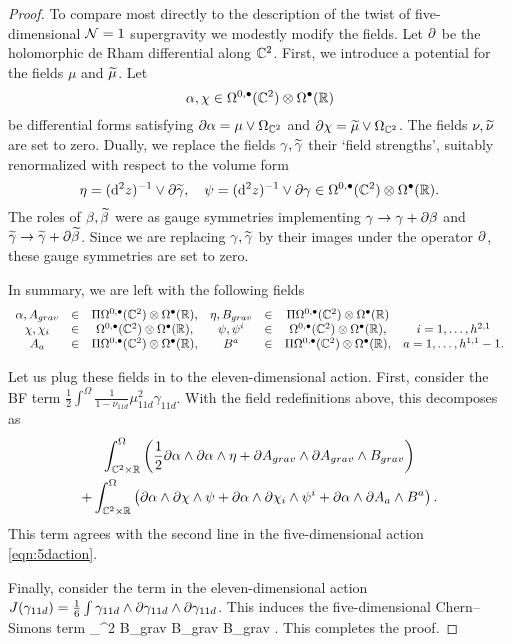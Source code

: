 \begin{proof}
To compare most directly to the description of the twist of five-dimensional $\mathcal N=1$ supergravity we modestly modify the fields. 
Let $\partial$ be the holomorphic de Rham differential along $\mathbb C^2$. 
First, we introduce a potential for the fields $\mu$ and $\widetilde \mu$. 
Let 
\[
\alpha, \chi \in \Omega^{0,\bullet}(\mathbb C^2) \otimes \Omega^\bullet(\mathbb R)
\]
be differential forms satisfying $\partial \alpha = \mu \vee \Omega_{\mathbb C^2}$ and $\partial \chi = \widetilde \mu \vee \Omega_{\mathbb C^2}$. 
The fields $\nu, \widetilde \nu$ are set to zero. 
Dually, we replace the fields $\gamma, \widetilde \gamma$ their `field strengths', suitably renormalized with respect to the volume form
\[
\eta = ({\rm d}^2 z)^{-1} \vee \partial \widetilde \gamma , \quad \psi = ({\rm d}^2 z)^{-1} \vee \partial \gamma \in \Omega^{0,\bullet}(\mathbb C^2) \otimes \Omega^\bullet(\mathbb R) .
\]
The roles of $\beta, \widetilde \beta$ were as gauge symmetries implementing $\gamma \to \gamma + \partial \beta$ and $\widetilde \gamma \to \widetilde \gamma + \partial \widetilde \beta$. 
Since we are replacing $\gamma, \widetilde \gamma$ by their images under the operator $\partial$, these gauge symmetries are set to zero. 

In summary, we are left with the following fields 
\[
\begin{array}{cccccccccc}
\alpha,A_{grav} & \in & \Pi \Omega^{0,\bullet}(\mathbb C^2) \otimes \Omega^\bullet(\mathbb R), & \eta, B_{grav} & \in & \Pi \Omega^{0,\bullet}(\mathbb C^2) \otimes \Omega^\bullet(\mathbb R) \\
\chi, \chi_i & \in & \Omega^{0,\bullet}(\mathbb C^2) \otimes \Omega^\bullet(\mathbb R),  & \psi, \psi^i & \in & \Omega^{0,\bullet}(\mathbb C^2) \otimes \Omega^\bullet(\mathbb R), & i=1,\ldots, h^{2,1}  \\
A_a & \in & \Pi \Omega^{0,\bullet}(\mathbb C^2) \otimes \Omega^\bullet(\mathbb R), & B^a & \in & \Pi \Omega^{0,\bullet}(\mathbb C^2) \otimes \Omega^\bullet(\mathbb R) , & a = 1, \ldots, h^{1,1}-1.
\end{array}
\]

Let us plug these fields in to the eleven-dimensional action.
First, consider the BF term $\frac12 \int^{\Omega} \frac{1}{1-\nu_{11d}} \mu_{11d}^2 \gamma_{11d}$. 
With the field redefinitions above, this decomposes as
\begin{multline}\label{eqn:5dsugra1}
 \int_{\mathbb C^2 \times \mathbb R}^\Omega \left( \frac12 \partial \alpha \wedge \partial \alpha \wedge \eta + \partial A_{grav} \wedge \partial A_{grav} \wedge B_{grav} \right) \\
 + \int_{\mathbb C^2 \times \mathbb R}^\Omega \left( \partial \alpha \wedge \partial \chi \wedge \psi + \partial \alpha \wedge \partial \chi_i \wedge \psi^i + \partial \alpha \wedge \partial A_a \wedge B^a \right) .
\end{multline}
This term agrees with the second line in the five-dimensional action \eqref{eqn:5daction}. 

Finally, consider the term in the eleven-dimensional action $J(\gamma_{11d}) = \frac16 \int \gamma_{11d} \wedge \partial \gamma_{11d} \wedge \partial \gamma_{11d}$. 
This induces the five-dimensional Chern--Simons term 
\beqn\label{eqn:5dsugra2}
 \int_{\CC^2 \times \RR} B_{grav} \del B_{grav} \del B_{grav} .
\eeqn
This completes the proof. 
\end{proof}


